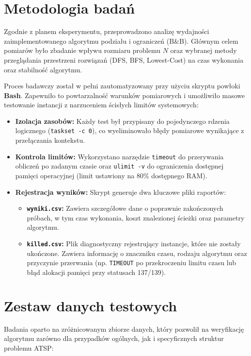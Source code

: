 \documentclass[12pt, a4paper]{article}
\begin{document}
\section{Metodologia badań}

Zgodnie z planem eksperymentu, przeprowadzono analizę wydajności zaimplementowanego algorytmu podziału i ograniczeń (B\&B). Głównym celem pomiarów było zbadanie wpływu rozmiaru problemu $N$ oraz wybranej metody przeglądania przestrzeni rozwiązań (DFS, BFS, Lowest-Cost) na czas wykonania oraz stabilność algorytmu.

Proces badawczy został w pełni zautomatyzowany przy użyciu skryptu powłoki \textbf{Bash}. Zapewniło to powtarzalność warunków pomiarowych i umożliwiło masowe testowanie instancji z narzuceniem ścisłych limitów systemowych:

\begin{itemize}
	\item \textbf{Izolacja zasobów:} Każdy test był przypisany do pojedynczego rdzenia logicznego (\texttt{taskset -c 0}), co wyeliminowało błędy pomiarowe wynikające z przełączania kontekstu.
	\item \textbf{Kontrola limitów:} Wykorzystano narzędzie \texttt{timeout} do przerywania obliczeń po zadanym czasie oraz \texttt{ulimit -v} do ograniczenia dostępnej pamięci operacyjnej (limit ustawiony na 80\% dostępnego RAM).
	\item \textbf{Rejestracja wyników:} Skrypt generuje dwa kluczowe pliki raportów:
	\begin{itemize}
		\item \textbf{\texttt{wyniki.csv}:} Zawiera szczegółowe dane o poprawnie zakończonych próbach, w tym czas wykonania, koszt znalezionej ścieżki oraz parametry algorytmu.
		\item \textbf{\texttt{killed.csv}:} Plik diagnostyczny rejestrujący instancje, które nie zostały ukończone. Zawiera informację o znaczniku czasu, rodzaju algorytmu oraz przyczynie przerwania (np. \texttt{TIMEOUT} po przekroczeniu limitu czasu lub błąd alokacji pamięci przy statusach 137/139).
	\end{itemize}
\end{itemize}

\section{Zestaw danych testowych}

Badania oparto na zróżnicowanym zbiorze danych, który pozwolił na weryfikację algorytmu zarówno dla przypadków ogólnych, jak i specyficznych struktur problemu ATSP:
\end{document}
